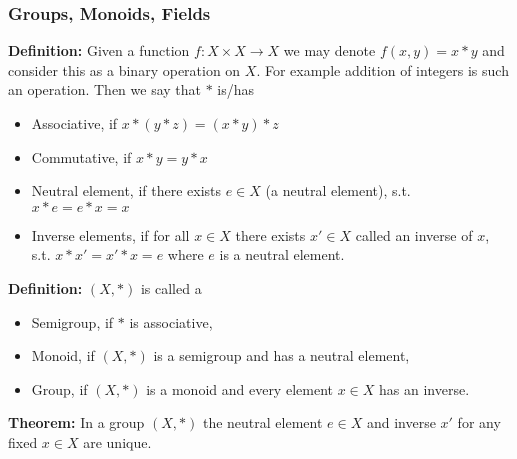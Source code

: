 \documentclass{article}
\begin{document}
\subsubsection{Groups, Monoids, Fields}

\textbf{Definition:} Given a function $f: X \times X \rightarrow X$ we may denote $f(x,y) = x * y$ and consider this as a binary operation on $X$. For example addition of integers is such an operation. Then we say that $*$ is/has 
\begin{itemize}
    \item Associative, if $x * (y * z) = (x * y) * z$
    \item Commutative, if $x * y = y * x$
    \item Neutral element, if there exists $e \in X$ (a neutral element), s.t. $x * e = e * x = x$
    \item Inverse elements, if for all $x \in X$ there exists $x' \in X$ called an inverse of $x$, s.t. $x * x' = x' * x = e$ where $e$ is a neutral element.
\end{itemize}

\noindent\textbf{Definition:} $(X,*)$ is called a 
\begin{itemize}
    \item Semigroup, if $*$ is associative,
    \item Monoid, if $(X,*)$ is a semigroup and has a neutral element,
    \item Group, if $(X,*)$ is a monoid and every element $x \in X$ has an inverse.
\end{itemize}

\noindent\textbf{Theorem:} In a group $(X,*)$ the neutral element $e \in X$ and inverse $x'$ for any fixed $x \in X$ are unique.
\end{document}
